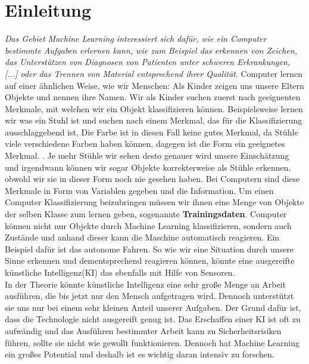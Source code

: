 \section{Einleitung}


\textit{Das Gebiet Machine Learning interessiert sich dafür, wie ein Computer bestimmte Aufgaben erlernen kann, wie zum Beispiel das erkennen von Zeichen, das Unterstützen von Diagnosen von Patienten unter schweren Erkrankungen, [...] oder das Trennen von Material entsprechend ihrer Qualität}\citep{MLDefinition}. Computer lernen auf einer ähnlichen Weise, wie wir Menschen: Als Kinder zeigen uns unsere Eltern Objekte und nennen ihre Namen. Wir als Kinder suchen zuerst nach geeignenten Merkmale, mit welchen wir ein Objekt klassifizieren können. Beispielsweise lernen wir was ein Stuhl ist und suchen nach einem Merkmal, das für die Klassifizierung ausschlaggebend ist, Die Farbe ist in diesen Fall keine gutes Merkmal, da Stühle viele verschiedene Farben haben können, dagegen ist die Form ein geeignetes Merkmal. \citep{MLDefinition}. Je mehr Stühle wir sehen desto genauer wird unsere Einschätzung und irgendwann können wir sogar Objekte korrekterweise als Stühle erkennen, obwohl wir sie in dieser Form noch nie gesehen haben. Bei Computern sind diese Merkmale in Form von Variablen gegeben und die Information. Um einen Computer Klassifizierung beizubringen müssen wir ihnen eine Menge von Objekte der selben Klasse zum lernen geben, sogenannte \textbf{Trainingsdaten}. Computer können nicht nur Objekte durch Machine Learning klassifizieren, sondern auch Zustände und anhand dieser kann die Maschine automatisch reagieren. Ein Beispiel dafür ist das autonome Fahren. So wie wir eine Situation durch unsere Sinne erkennen und dementsprechend reagieren können, könnte eine ausgereifte künstliche Intelligenz(KI) das ebenfalls mit Hilfe von Sensoren.\\

In der Theorie könnte künstliche Intelligenz eine sehr große Menge an Arbeit ausführen, die bis jetzt nur den Mensch aufgetragen wird. Dennoch unterstützt sie uns nur bei einem sehr kleinen Anteil unserer Aufgaben. Der Grund dafür ist, dass die Technologie nicht ausgereift genug ist. Das Erschaffen einer KI ist oft zu aufwändig und das Ausführen bestimmter Arbeit kann zu Sicherheitsrisiken führen, sollte sie nicht wie gewollt funktionieren. Dennoch hat Machine Learning ein großes Potential und deshalb ist es wichtig daran intensiv zu forschen. 

